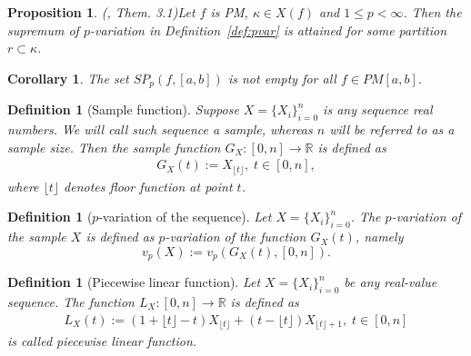 \documentclass[12pt, a4paper]{article}
\newtheorem{proposition}[theorem]{Proposition}
\newtheorem{definition}[theorem]{Definition}
\newtheorem{corollary}[theorem]{Corollary}
\numberwithin{equation}{section}
\begin{document}
\begin{proposition}(\cite{Qian}, Them. 3.1)\label{prop:sup_in_PM}
  Let $f$ is PM, $\kappa \in X(f)$ and $1 \leq p < \infty$. 
  Then the supremum of $p$-variation in Definition~\ref{def:pvar}
  is attained for some partition $r \subset  \kappa$.
\end{proposition} 
\begin{corollary}\label{cor:SPNotEmpty}
  The set $SP_{p}(f,[a,b])$ is not empty for all $f \in PM[a,b]$.  
\end{corollary}


\begin{definition}[Sample function]\label{def:Seq2Fun}
  Suppose $X=\{X_{i}\}_{i=0}^{n}$ is any sequence real numbers. 
  We will call such sequence a \emph{sample}, 
  whereas $n$ will be referred to as a \emph{sample size}.
  Then the \emph{sample function}  
  $G_X:[0,n] \rightarrow \mathbb{R}$ is defined as 
  \begin{eqnarray}
    G_X(t) := X_{\lfloor t \rfloor},\;t\in[0,n],
  \end{eqnarray}
  where $\lfloor t \rfloor$ denotes floor function at point $t$. 
\end{definition} 

\begin{definition}[$p$-variation of the sequence]\label{def:pvarseq}
  Let $X=\{X_i\}_{i=0}^n$. The $p$-variation
  of the sample $X$ is defined as $p$-variation of the 
  function $G_X(t)$, namely
  \begin{equation}
    v_p(X) := v_p(G_X(t),[0,n]).
  \end{equation}
\end{definition}

\begin{definition}[Piecewise linear function]\label{def:poligon}
  Let $X=\{X_i\}_{i=0}^n$ be any real-value sequence. 
  The function $L_X:[0,n] \rightarrow \mathbb{R}$ is defined as
  \begin{eqnarray}
  L_X(t) := (1+\lfloor t \rfloor-t)X_{\lfloor t \rfloor} + (t-\lfloor t \rfloor)X_{\lfloor t \rfloor+1}   ,\;t\in[0,n]
  \end{eqnarray}
  is called \emph{piecewise linear function}.
\end{definition}
\end{document}
